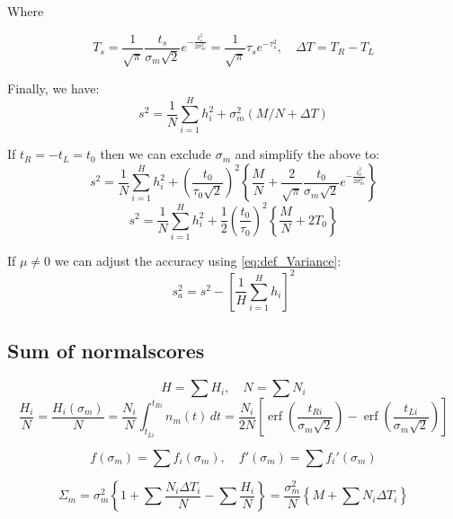 \documentclass[12pt]{article}
\begin{document}
Where

\[
    T_s =
    \frac{1}{\sqrt{\pi}} \frac{t_s}{\sigma_m\sqrt{2}} e^{-\frac{t_s^2}{2\sigma_m^2}} =
    \frac{1}{\sqrt{\pi}} \tau_s e^{-\tau_s^2}
    , \quad
    \Delta T = T_R - T_L
\]

Finally, we have:
\[
s^2 =
\frac{1}{N} \sum_{i = 1}^{H} h_i^2 +
\sigma_m^2 (M / N + \Delta T)
\]

If \(t_R = -t_L = t_0\) then we can exclude \(\sigma_m\) and simplify the above to:
\[
s^2 =
\frac{1}{N} \sum_{i = 1}^{H} h_i^2 +
\left(\frac{t_0}{\tau_0\sqrt{2}}\right)^2
\left\{
    \frac{M}{N} +
    \frac{2}{\sqrt{\pi}} \frac{t_0}{\sigma_m\sqrt{2}} e^{-\frac{t_0^2}{2\sigma_m^2}}
\right\}
\]
\[
s^2 =
\frac{1}{N} \sum_{i = 1}^{H} h_i^2 +
\frac{1}{2}
\left(\frac{t_0}{\tau_0}\right)^2
\left\{
    \frac{M}{N} +
    2 T_0
\right\}
\]

If \(\mu \neq 0\) we can adjust the accuracy using \eqref{eq:def_Variance}:
\[
s_a^2 = s^2 - \left[ \frac{1}{H} \sum_{i = 1}^{H} h_i \right]^2
\]

\subsection*{Sum of normalscores}

\[
    H = \sum H_i, \quad N = \sum N_i
\]
\[
\frac{H_i}{N} = \frac{H_i(\sigma_m)}{N} = \frac{N_i}{N} \int_{t_{Li}}^{t_{Ri}} n_m(t) \,dt =
\frac{N_i}{2N} \left[ \operatorname{erf}\left(\frac{t_{Ri}}{\sigma_m\sqrt{2}}\right) - \operatorname{erf}\left(\frac{t_{Li}}{\sigma_m\sqrt{2}}\right) \right]
\]

\[
f(\sigma_m) = \sum f_i(\sigma_m), \quad
f'(\sigma_m) = \sum {f_i}'(\sigma_m)
\]

\[
\Sigma_m =
\sigma_m^2
\left\{
    1 + \sum \frac{N_i \Delta T_i}{N} - \sum \frac{H_i}{N}
\right\} =
\frac{\sigma_m^2}{N}
\left\{
    M +
    \sum N_i \Delta T_i
\right\}
\]
\end{document}
